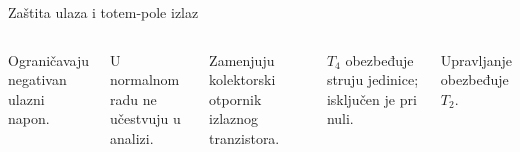 \begin{frame}[label=10-s056]{Zaštita ulaza i totem-pole izlaz}
\setlength{\abovedisplayskip}{4pt}\setlength{\belowdisplayskip}{4pt}\setlength{\abovedisplayshortskip}{3pt}\setlength{\belowdisplayshortskip}{3pt}
\begin{columns}[T,onlytextwidth]\centering \raggedright{}\medskip
Ograničavaju negativan ulazni napon.\par
U normalnom radu ne učestvuju u analizi.\par\bigskip
{}\medskip
Zamenjuju kolektorski otpornik izlaznog tranzistora.\par
$T_4$ obezbeđuje struju jedinice; isključen je pri nuli.\par
Upravljanje obezbeđuje $T_2$.\end{columns}
\end{frame}
